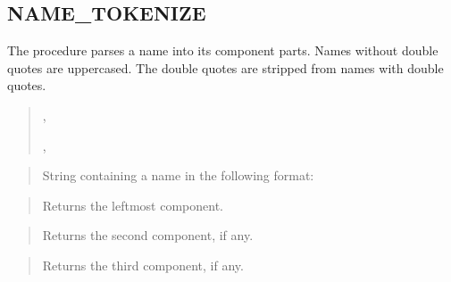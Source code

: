 \documentclass[letterpaper,10pt,english,openany,oneside]{sphinxmanual}
\begin{document}
\newpage


\subsection{NAME\_TOKENIZE}
\label{\detokenize{dbms_utility:name-tokenize}}
The  procedure parses a name into its component parts.
Names without double quotes are uppercased. The double quotes are
stripped from names with double quotes.
\begin{quote}

\begin{DUlineblock}{0em}
\item[] ,
\item[] ,
\item[] 
\end{DUlineblock}
\end{quote}


\begin{quote}

String containing a name in the following format:

\end{quote}

\begin{quote}

Returns the leftmost component.
\end{quote}

\begin{quote}

Returns the second component, if any.
\end{quote}

\begin{quote}

Returns the third component, if any.
\end{quote}
\end{document}
